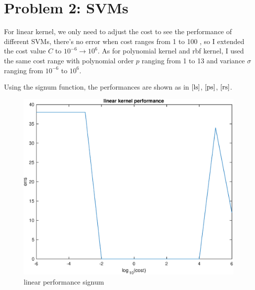 \documentclass[a4paper,12pt]{article}
\begin{document}
\section{Problem 2: SVMs}

For linear kernel, we only need to adjust the cost to see the performance of different SVMs, there's no error when cost ranges from 1 to 100 , so I extended the cost value $C$ to $10^{-6} \to 10^{6}$. As for polynomial kernel and rbf kernel, I used the same cost range with polynomial order $p$ ranging  from 1 to 13 and variance $\sigma$ ranging from $10^{-6}$ to $10^{6}$.

Using the signum function, the performances are shown as in $\ref{ls}$, $\ref{ps}$, $\ref{rs}$.
\begin{figure}
\centering
\includegraphics[width=.7\textwidth]{figure/linear_performance_s.eps}
\caption{linear performance signum}
\label{ls}
\end{figure}
\end{document}

